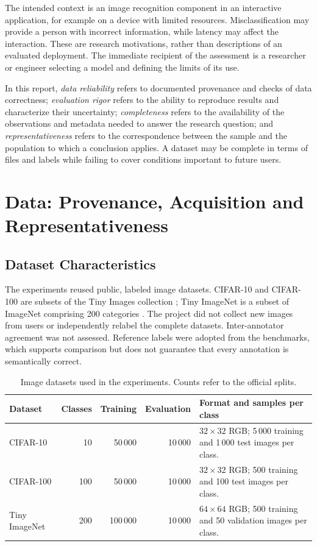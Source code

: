 \documentclass[12pt,a4paper]{article}
\begin{document}
The intended context is an image recognition component in an interactive
application, for example on a device with limited resources.
Misclassification may provide a person with incorrect information,
while latency may affect the interaction. These are research motivations,
rather than descriptions of an evaluated deployment. The immediate
recipient of the assessment is a researcher or engineer selecting a model
and defining the limits of its use.

In this report, \emph{data reliability} refers to documented provenance
and checks of data correctness; \emph{evaluation rigor} refers to the
ability to reproduce results and characterize their uncertainty;
\emph{completeness} refers to the availability of the observations and
metadata needed to answer the research question; and
\emph{representativeness} refers to the correspondence between the sample
and the population to which a conclusion applies. A dataset may be complete
in terms of files and labels while failing to cover conditions important
to future users.

\section{Data: Provenance, Acquisition and Representativeness}

\subsection{Dataset Characteristics}

The experiments reused public, labeled image datasets. CIFAR-10 and
CIFAR-100 are subsets of the Tiny Images collection \cite{cifar};
Tiny ImageNet is a subset of ImageNet comprising 200 categories
\cite{tinyimagenet}. The project did not collect new images from users
or independently relabel the complete datasets. Inter-annotator agreement
was not assessed. Reference labels were adopted from the benchmarks,
which supports comparison but does not guarantee that every annotation
is semantically correct.

\begin{table}[htbp]
\centering\small
\caption{Image datasets used in the experiments. Counts refer to the official splits.}
\begin{tabularx}{\textwidth}{@{}lrrrY@{}}
\toprule
Dataset & Classes & Training & Evaluation & Format and samples per class \\
\midrule
CIFAR-10 & 10 & 50\,000 & 10\,000 & $32\times32$ RGB;
5\,000 training and 1\,000 test images per class. \\
CIFAR-100 & 100 & 50\,000 & 10\,000 & $32\times32$ RGB;
500 training and 100 test images per class. \\
Tiny ImageNet & 200 & 100\,000 & 10\,000 & $64\times64$ RGB;
500 training and 50 validation images per class. \\
\bottomrule
\end{tabularx}
\end{table}
\end{document}
